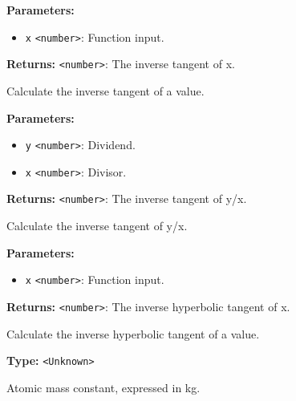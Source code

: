 \documentclass[12pt,a4paper]{article}
\begin{document}
\noindent \textbf{Parameters:}
\begin{itemize}
  \item \texttt{x} \texttt{<number>}: Function input.
\end{itemize}

\noindent \textbf{Returns:} \texttt{<number>}: The inverse tangent of \textasciigrave{}x\textasciigrave{}.

\noindent Calculate the inverse tangent of a value.

\vspace{5mm}
\noindent {}


\noindent \textbf{Parameters:}
\begin{itemize}
  \item \texttt{y} \texttt{<number>}: Dividend.
  \item \texttt{x} \texttt{<number>}: Divisor.
\end{itemize}

\noindent \textbf{Returns:} \texttt{<number>}: The inverse tangent of \textasciigrave{}y/x\textasciigrave{}.

\noindent Calculate the inverse tangent of \textasciigrave{}y/x\textasciigrave{}.

\vspace{5mm}
\noindent {}


\noindent \textbf{Parameters:}
\begin{itemize}
  \item \texttt{x} \texttt{<number>}: Function input.
\end{itemize}

\noindent \textbf{Returns:} \texttt{<number>}: The inverse hyperbolic tangent of \textasciigrave{}x\textasciigrave{}.

\noindent Calculate the inverse hyperbolic tangent of a value.

\vspace{5mm}
\noindent {}\vspace{4mm}


\noindent \textbf{Type:} \texttt{<Unknown>}

\noindent Atomic mass constant, expressed in kg.
\end{document}
